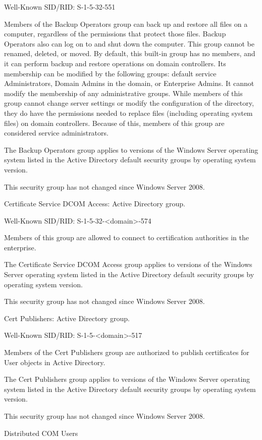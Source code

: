 Well-Known SID/RID: S-1-5-32-551

Members of the Backup Operators group can back up and restore all files on a computer, regardless of the permissions that protect those files. Backup Operators also can log on to and shut down the computer. This group cannot be renamed, deleted, or moved. By default, this built-in group has no members, and it can perform backup and restore operations on domain controllers. Its membership can be modified by the following groups: default service Administrators, Domain Admins in the domain, or Enterprise Admins. It cannot modify the membership of any administrative groups. While members of this group cannot change server settings or modify the configuration of the directory, they do have the permissions needed to replace files (including operating system files) on domain controllers. Because of this, members of this group are considered service administrators.

The Backup Operators group applies to versions of the Windows Server operating system listed in the Active Directory default security groups by operating system version.

This security group has not changed since Windows Server 2008.

Certificate Service DCOM Access: Active Directory group.

Well-Known SID/RID: S-1-5-32-<domain>-574

Members of this group are allowed to connect to certification authorities in the enterprise.

The Certificate Service DCOM Access group applies to versions of the Windows Server operating system listed in the Active Directory default security groups by operating system version.

This security group has not changed since Windows Server 2008.

Cert Publishers: Active Directory group.

Well-Known SID/RID: S-1-5-<domain>-517

Members of the Cert Publishers group are authorized to publish certificates for User objects in Active Directory.

The Cert Publishers group applies to versions of the Windows Server operating system listed in the Active Directory default security groups by operating system version.

This security group has not changed since Windows Server 2008.

Distributed COM Users

